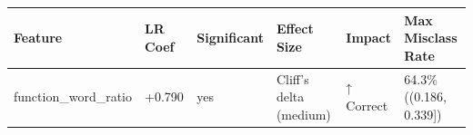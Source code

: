 \begin{tabular}{llllll}
\toprule
Feature & LR Coef & Significant & Effect Size & Impact & Max Misclass Rate \\
\midrule
function\_word\_ratio & +0.790 & yes & Cliff's delta (medium) & ↑ Correct & 64.3\% ((0.186, 0.339]) \\
\bottomrule
\end{tabular}
